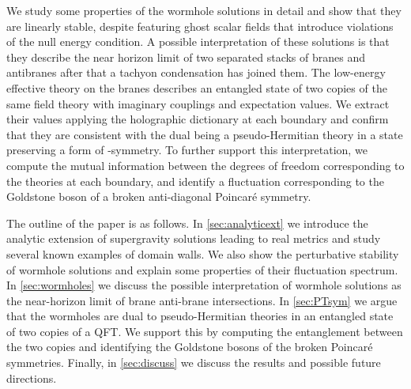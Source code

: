We study some properties of the wormhole solutions in detail and show that they are linearly stable, despite featuring ghost scalar fields that introduce violations of the null energy condition.
A possible interpretation of these solutions is that they describe the near horizon limit of two separated stacks of branes and antibranes after that a tachyon condensation has joined them.
The low-energy effective theory on the branes describes an entangled state of two copies of the same field theory with imaginary couplings and expectation values.
We extract their values applying the holographic dictionary at each boundary and confirm that they are consistent with the dual being a pseudo-Hermitian theory in a state preserving a form of \PT-symmetry.
To further support this interpretation, we compute the mutual information between the degrees of freedom corresponding to the theories at each boundary, and identify a fluctuation corresponding to the Goldstone boson of a broken anti-diagonal Poincar\'e symmetry.

The outline of the paper is as follows.
In \cref{sec:analyticext} we introduce the analytic extension of supergravity solutions leading to real metrics and study several known examples of domain walls.
We also show the perturbative stability of wormhole solutions and explain some properties of their fluctuation spectrum.
In \cref{sec:wormholes} we discuss the possible interpretation of wormhole solutions as the near-horizon limit of brane anti-brane intersections.
In \cref{sec:PTsym} we argue that the wormholes are dual to pseudo-Hermitian theories in an entangled state of two copies of a QFT.
We support this by computing the entanglement between the two copies and identifying the Goldstone bosons of the broken Poincar\'e symmetries.
Finally, in \cref{sec:discuss} we discuss the results and possible future directions.


